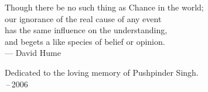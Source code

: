 \thispagestyle{empty}
{}

\vspace*{3cm}

%

%
%
%
%

\begin{center}
Though there be no such thing as Chance in the world; \\
our ignorance of the real cause of any event \\
has the same influence on the understanding, \\
and begets a like species of belief or opinion. \\ \medskip
    --- David Hume
\end{center}

\medskip

\begin{center}
    Dedicated to the loving memory of Pushpinder Singh. \\ \,--\,2006
\end{center}
